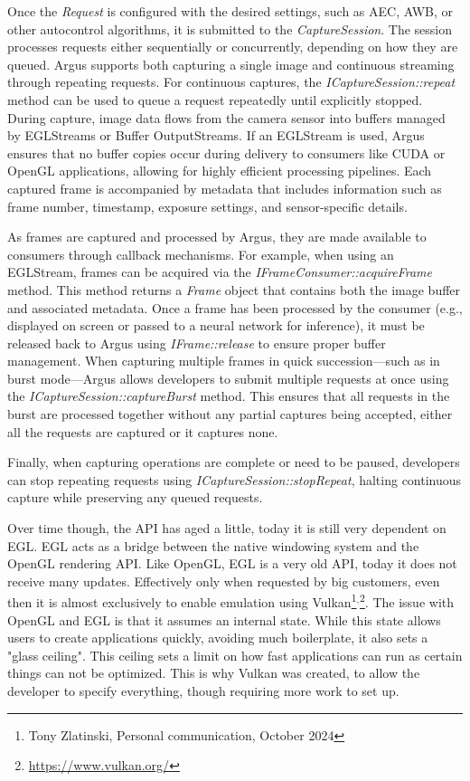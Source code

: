 Once the \textit{Request} is configured with the desired settings, such as
AEC, AWB, or other autocontrol algorithms, it is submitted to the
\textit{CaptureSession}. The session processes requests either sequentially or
concurrently, depending on how they are queued. Argus supports both capturing a
single image and continuous streaming through repeating requests. For continuous
captures, the \textit{ICaptureSession::repeat} method can be used to queue a request
repeatedly until explicitly stopped. During capture, image data flows from the
camera sensor into buffers managed by EGLStreams or Buffer OutputStreams. If an
EGLStream is used, Argus ensures that no buffer copies occur during delivery to
consumers like CUDA or OpenGL applications, allowing for highly efficient
processing pipelines. Each captured frame is accompanied by metadata that
includes information such as frame number, timestamp, exposure settings, and
sensor-specific details.

As frames are captured and processed by Argus, they are made available to
consumers through callback mechanisms. For example, when using an EGLStream,
frames can be acquired via the \textit{IFrameConsumer::acquireFrame} method.
This method returns a \textit{Frame} object that contains both the image buffer
and associated metadata. Once a frame has been processed by the consumer (e.g.,
displayed on screen or passed to a neural network for inference), it must be
released back to Argus using \textit{IFrame::release} to ensure proper buffer
management. When capturing multiple frames in quick succession—such as in burst
mode—Argus allows developers to submit multiple requests at once using the
\textit{ICaptureSession::captureBurst} method. This ensures that all requests
in the burst are processed together without any partial captures being
accepted, either all the requests are captured or it captures none.

Finally, when capturing operations are complete or need to be paused,
developers can stop repeating requests using \textit{ICaptureSession::stopRepeat}, halting
continuous capture while preserving any queued requests.

Over time though, the API has aged a little, today it is still very dependent
on EGL. EGL acts as a bridge between the native windowing system and the OpenGL rendering API.
Like OpenGL, EGL is a very old API, today it does not receive many
updates. Effectively only when requested by big customers, even then it is
almost exclusively to enable emulation using Vulkan\footnote{Tony Zlatinski,
Personal communication, October 2024}$^,$\footnote{\url{https://www.vulkan.org/}}.
The issue with OpenGL and EGL is that it assumes an internal state. While this
state allows users to create applications quickly, avoiding much boilerplate,
it also sets a "glass ceiling". This ceiling sets a limit on how fast
applications can run as certain things can not be optimized. This is why Vulkan
was created, to allow the developer to specify everything, though requiring
more work to set up.

